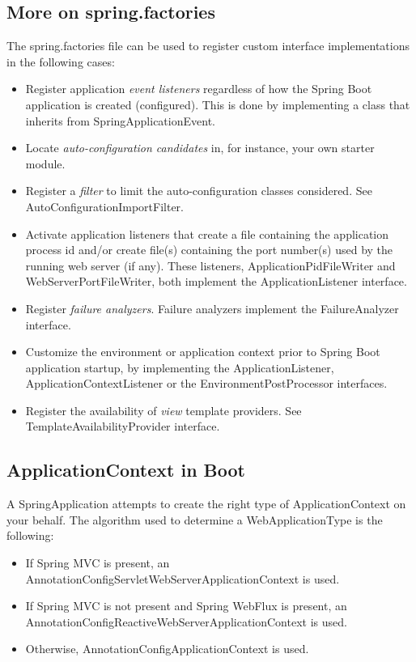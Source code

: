 \documentclass{scrartcl}
\begin{document}
\subsection{More on spring.factories}

The spring.factories file can be used to register custom interface implementations in the following cases:

\begin{itemize}
    \item Register application \textit{event listeners} regardless of how the Spring Boot application is created (configured). This is done by implementing a class that inherits from SpringApplicationEvent.
    \item Locate \textit{auto-configuration candidates} in, for instance, your own starter module.
    \item Register a \textit{filter} to limit the auto-configuration classes considered. See AutoConfigurationImportFilter.
    \item  Activate application listeners that create a file containing the application process id and/or create file(s) containing the port number(s) used by the running web server (if any). These listeners, ApplicationPidFileWriter and WebServerPortFileWriter, both implement the ApplicationListener interface.
    \item Register \textit{failure analyzers}. Failure analyzers implement the FailureAnalyzer interface.
    \item Customize the environment or application context prior to Spring Boot application startup, by implementing the ApplicationListener, ApplicationContextListener or the EnvironmentPostProcessor interfaces.
    \item Register the availability of \textit{view} template providers. See TemplateAvailabilityProvider interface.
\end{itemize}
\subsection{ApplicationContext in Boot}

A SpringApplication attempts to create the right type of ApplicationContext on your behalf. The algorithm used to determine a WebApplicationType is the following:

\begin{itemize}
    \item If Spring MVC is present, an AnnotationConfigServletWebServerApplicationContext is used.
    \item If Spring MVC is not present and Spring WebFlux is present, an AnnotationConfigReactiveWebServerApplicationContext is used.
    \item Otherwise, AnnotationConfigApplicationContext is used.
\end{itemize}
\end{document}
